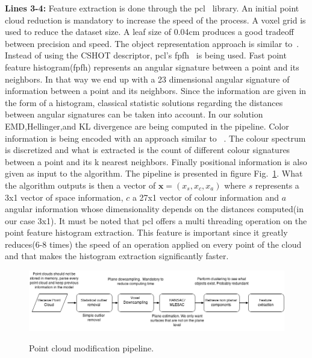 \documentclass[twoside,hidelinks]{article}
\begin{document}
\textbf{Lines 3-4:} Feature extraction is done through the pcl~\cite{pcl} library. An initial point cloud reduction is mandatory to increase the speed of the process. A voxel grid is used to reduce the dataset size. A leaf size of 0.04cm produces a good tradeoff between precision and speed. The object representation approach is similar to~\cite{objectpointslam}. Instead of using the CSHOT descriptor, pcl's fpfh~\cite{fpfh} is being used. Fast point feature histogram(fpfh) represents an angular signature between a point and its neighbors. In that way we end up with a 23 dimensional angular signature of information between a point and its neighbors. Since the information are given in the form of a histogram, classical statistic solutions regarding the distances between angular signatures can be taken into account. In our solution EMD,Hellinger,and KL divergence are being computed in the pipeline. Color information is being encoded with an approach similar to ~\cite{smcddp}. The colour spectrum is discretized and what is extracted is the count of different colour signatures between a point and its k nearest neighbors. Finally positional information is also given as input to the algorithm. The pipeline is presented in figure Fig.~\ref{pcl:mod}. What the algorithm outputs is then a vector of $ \textbf{x} = (x_s, x_c, x_a) $ where $s$ represents a 3x1 vector of space information, $c$ a 27x1 vector of colour information and $a$ angular information whose dimensionality depends on the distances computed(in our case 3x1). It must be noted that pcl offers a multi threading operation on the point feature histogram extraction. This feature is important since it greatly reduces(6-8 times) the speed of an operation applied on every point of the cloud and that makes the histogram extraction significantly faster.

\begin{figure}[h!]
  \caption{Point cloud modification pipeline.}
  \centering
    \includegraphics[width=1\textwidth]{Basic}
  \label{pcl:mod}
\end{figure}
\end{document}
